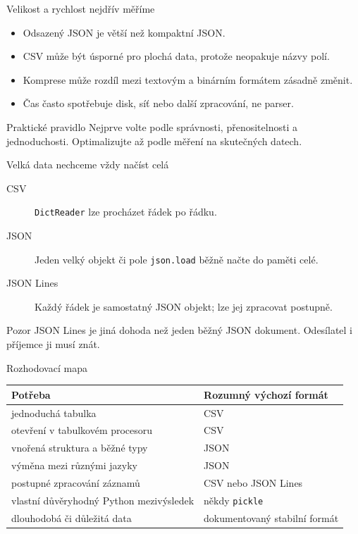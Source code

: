 \documentclass[aspectratio=169]{beamer}
\begin{document}
\begin{frame}{Velikost a rychlost nejdřív měříme}
  \begin{itemize}
    \item Odsazený JSON je větší než kompaktní JSON.
    \item CSV může být úsporné pro plochá data, protože neopakuje názvy polí.
    \item Komprese může rozdíl mezi textovým a binárním formátem zásadně změnit.
    \item Čas často spotřebuje disk, síť nebo další zpracování, ne parser.
  \end{itemize}
  \begin{block}{Praktické pravidlo}
    Nejprve volte podle správnosti, přenositelnosti a jednoduchosti. Optimalizujte až podle měření na skutečných datech.
  \end{block}
\end{frame}

\begin{frame}{Velká data nechceme vždy načíst celá}
  \begin{description}
    \item[CSV] \texttt{DictReader} lze procházet řádek po řádku.
    \item[JSON] Jeden velký objekt či pole \texttt{json.load} běžně načte do paměti celé.
    \item[JSON Lines] Každý řádek je samostatný JSON objekt; lze jej zpracovat postupně.
  \end{description}
  \begin{alertblock}{Pozor}
    JSON Lines je jiná dohoda než jeden běžný JSON dokument. Odesílatel i příjemce ji musí znát.
  \end{alertblock}
\end{frame}

\begin{frame}{Rozhodovací mapa}
  \centering
  \begin{tabular}{ll}
    \textbf{Potřeba} & \textbf{Rozumný výchozí formát} \\
    \hline
    jednoduchá tabulka & CSV \\
    otevření v tabulkovém procesoru & CSV \\
    vnořená struktura a běžné typy & JSON \\
    výměna mezi různými jazyky & JSON \\
    postupné zpracování záznamů & CSV nebo JSON Lines \\
    vlastní důvěryhodný Python mezivýsledek & někdy \texttt{pickle} \\
    dlouhodobá či důležitá data & dokumentovaný stabilní formát \\
  \end{tabular}
\end{frame}
\end{document}
